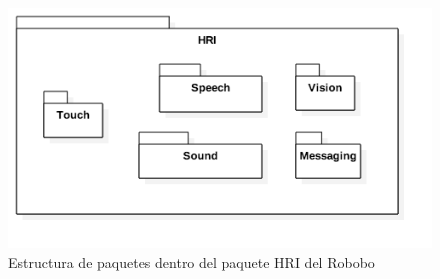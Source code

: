 \begin{figure}
	\centering
	\includegraphics[width=1\linewidth]{imagenes/diagramas/PaquetesGenerales.png}
	\caption{Estructura de paquetes dentro del paquete HRI del Robobo}
	\label{fig:general-package-structure}
\end{figure}

